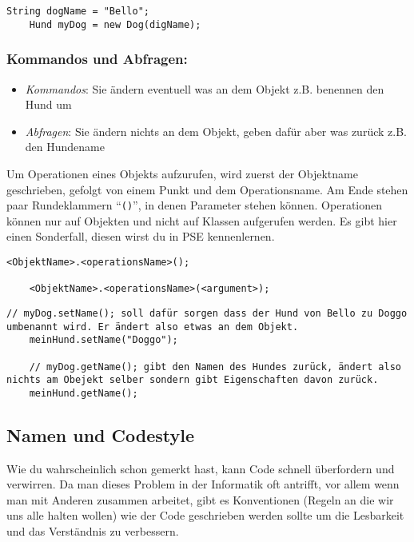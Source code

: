 \begin{lstlisting}[title=\textbf{Beispiel: Variable}]
	String dogName = "Bello";
	Hund myDog = new Dog(digName);
\end{lstlisting}

\begin{Infobox}
	\subsubsection*{Kommandos und Abfragen:}
	\begin{itemize}
		\item \textit{Kommandos}: Sie ändern eventuell was an dem Objekt z.B. benennen den Hund um
		\item \textit{Abfragen}: Sie ändern nichts an dem Objekt, geben dafür aber was zurück z.B. den Hundename
	\end{itemize}
	Um Operationen eines Objekts aufzurufen, wird zuerst der Objektname geschrieben, gefolgt von einem Punkt und dem Operationsname.
	Am Ende stehen paar Rundeklammern \enquote{\lstinline{()}}, in denen Parameter stehen können.\newline
	\important Operationen können nur auf Objekten und nicht auf Klassen aufgerufen werden.
	Es gibt hier einen Sonderfall, diesen wirst du in PSE kennenlernen.
\end{Infobox}

\begin{lstlisting}[title=\textbf{Kommando/Abfrage Syntax}]
	<ObjektName>.<operationsName>();

	<ObjektName>.<operationsName>(<argument>);
\end{lstlisting}

\begin{lstlisting}[title=\textbf{Beispiel: Kommando/Abfrage}]
	// myDog.setName(); soll dafür sorgen dass der Hund von Bello zu Doggo umbenannt wird. Er ändert also etwas an dem Objekt.
	meinHund.setName("Doggo");

	// myDog.getName(); gibt den Namen des Hundes zurück, ändert also nichts am Obejekt selber sondern gibt Eigenschaften davon zurück.
	meinHund.getName();
\end{lstlisting}


\subsection*{Namen und Codestyle}
Wie du wahrscheinlich schon gemerkt hast, kann Code schnell überfordern und verwirren.\newline
Da man dieses Problem in der Informatik oft antrifft, vor allem wenn man mit Anderen zusammen arbeitet, gibt es Konventionen (Regeln an die wir uns alle halten wollen) wie der Code geschrieben werden sollte um die Lesbarkeit und das Verständnis zu verbessern.

